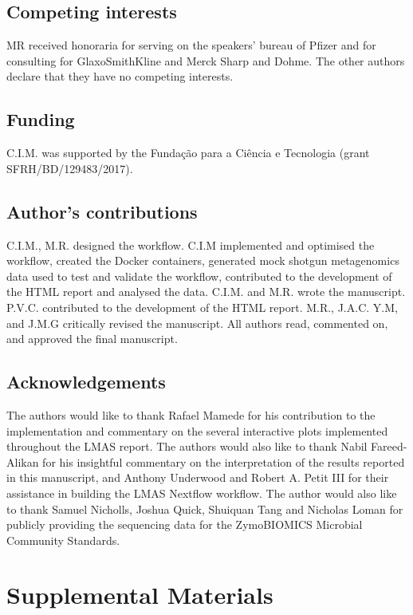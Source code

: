 \subsection{Competing interests}

MR received honoraria for serving on the speakers' bureau of Pﬁzer and for consulting for GlaxoSmithKline and Merck Sharp and Dohme. The other authors declare that they have no competing interests. 

\subsection{Funding}

C.I.M. was supported by the Fundação para a Ciência e Tecnologia (grant SFRH/BD/129483/2017).

\subsection{Author’s contributions}

C.I.M., M.R. designed the workflow. C.I.M implemented and optimised the workflow, created the Docker containers, generated mock shotgun metagenomics data used to test and validate the workflow, contributed to the development of the HTML report and analysed the data. C.I.M. and M.R. wrote the manuscript. P.V.C. contributed to the development of the HTML report. M.R., J.A.C. Y.M, and J.M.G critically revised the manuscript.  All authors read, commented on, and approved the final manuscript. 

\subsection{Acknowledgements}

The authors would like to thank Rafael Mamede for his contribution to the implementation and commentary on the several interactive plots implemented throughout the LMAS report. The authors would also like to thank Nabil Fareed-Alikan for his insightful commentary on the interpretation of the results reported in this manuscript, and Anthony Underwood and Robert A. Petit III for their assistance in building the LMAS Nextflow workflow. The author would also like to thank Samuel Nicholls, Joshua Quick, Shuiquan Tang and Nicholas Loman for publicly providing the sequencing data for the ZymoBIOMICS Microbial Community Standards.

\section{Supplemental Materials}

